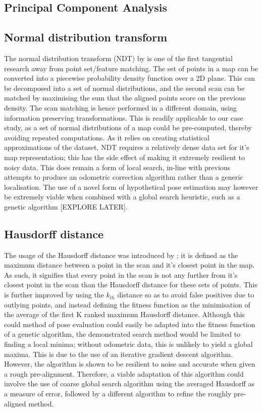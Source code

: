 \documentclass[authoryearcitations]{UoYCSproject}
\begin{document}
\subsection{Principal Component Analysis}
\subsection{Normal distribution transform}
The normal distribution transform (NDT) by \citet{Biber2003-kb} is one of the first tangential research away from point set/feature matching. The set of points in a map can be converted into a piecewise probability density function over a 2D plane. This can be decomposed into a set of normal distributions, and the second scan can be matched by maximising the sum that the aligned points score on the previous density. The scan matching is hence performed in a different domain, using information preserving transformations. This is readily applicable to our case study, as a set of normal distributions of a map could be pre-computed, thereby avoiding repeated computations. As it relies on creating statistical approximations of the dataset, NDT requires a relatively dense data set for it's map representation; this has the side effect of making it extremely resilient to noisy data. This does remain a form of local search, in-line with previous attempts to produce an odometric correction algorithm rather than a generic localisation. The use of a novel form of hypothetical pose estimation may however be extremely viable when combined with a global search heuristic, such as a genetic algorithm [EXPLORE LATER].


\subsection{Hausdorff distance}
The usage of the Hausdorff distance was introduced by \citet{Donoso-Aguirre2008-pb}; it is defined as the maximum distance between a point in the scan and it's closest point in the map. As such, it signifies that every point in the scan is not any further from it's closest point in the scan than the Hausdorff distance for these sets of points. This is further improved by using the $k_{th}$ distance so as to avoid false positives due to outlying points, and instead defining the fitness function as the minimisation of the average of the first K ranked maximum Hausdorff distance. Although this could method of pose evaluation could easily be adapted into the fitness function of a genetic algorithm, the demonstrated search method would be limited to finding a local minima; without odometric data, this is unlikely to yield a global maxima. This is due to the use of an iterative gradient descent algorithm. However, the algorithm is shown to be resilient to noise and accurate when given a rough pre-alignment. Therefore, a viable adaptation of this algorithm could involve the use of coarse global search algorithm using the averaged Hausdorff as a measure of error, followed by a different algorithm to refine the roughly pre-aligned method.
\end{document}
